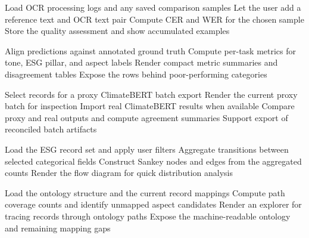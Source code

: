 \begin{algorithm}[H]
Load OCR processing logs and any saved comparison samples\;
Let the user add a reference text and OCR text pair\;
Compute CER and WER for the chosen sample\;
Store the quality assessment and show accumulated examples\;
\caption{OCR Quality Workbench}
\label{alg:ocr-quality-workbench}
\end{algorithm}

\begin{algorithm}[H]
Align predictions against annotated ground truth\;
Compute per-task metrics for tone, ESG pillar, and aspect labels\;
Render compact metric summaries and disagreement tables\;
Expose the rows behind poor-performing categories\;
\caption{Ground Truth Metrics}
\label{alg:ground-truth-metrics}
\end{algorithm}

\begin{algorithm}[H]
Select records for a proxy ClimateBERT batch export\;
Render the current proxy batch for inspection\;
Import real ClimateBERT results when available\;
Compare proxy and real outputs and compute agreement summaries\;
Support export of reconciled batch artifacts\;
\caption{ClimateBERT Record Batch}
\label{alg:climatebert-record-batch}
\end{algorithm}

\begin{algorithm}[H]
Load the ESG record set and apply user filters\;
Aggregate transitions between selected categorical fields\;
Construct Sankey nodes and edges from the aggregated counts\;
Render the flow diagram for quick distribution analysis\;
\caption{ESG Flow Sankey}
\label{alg:esg-flow-sankey}
\end{algorithm}

\begin{algorithm}[H]
Load the ontology structure and the current record mappings\;
Compute path coverage counts and identify unmapped aspect candidates\;
Render an explorer for tracing records through ontology paths\;
Expose the machine-readable ontology and remaining mapping gaps\;
\caption{Ontology Path Viewer}
\label{alg:ontology-path-viewer}
\end{algorithm}


